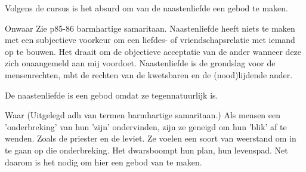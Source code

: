 \documentclass[main.tex]{subfiles}
\begin{document}
\begin{examenvraag}
    \begin{stelling}
        Volgens de cursus is het absurd om van de naastenliefde een gebod te maken.
    \end{stelling}

    \begin{stelling-antwoord}{Onwaar}
        Zie p85-86 barmhartige samaritaan.
        Naastenliefde heeft niets te maken met een subjectieve voorkeur om‭ ‬een liefdes-‭ ‬of 
        vriendschapsrelatie met iemand op te bouwen.‭ ‬Het draait om de objectieve acceptatie van de 
        ander wanneer deze zich onaangemeld aan mij voordoet.‭ ‬Naastenliefde is de grondslag voor de 
        mensenrechten,‭ ‬mbt de rechten van de kwetsbaren en de‭ (‬nood)lijdende ander.
    \end{stelling-antwoord}
\end{examenvraag}


\begin{examenvraag}
    \begin{stelling}
        De naastenliefde is een gebod omdat ze tegennatuurlijk is.
    \end{stelling}


    \begin{stelling-antwoord}{Waar}
        (Uitgelegd adh van termen barmhartige samaritaan.)
        Als mensen een 'onderbreking' van hun 'zijn' ondervinden, zijn ze geneigd om hun 'blik'
        af te wenden. 
        Zoals de priester en de leviet.
        Ze voelen een soort van weerstand om in te gaan op die onderbreking.
        Het dwarsboompt hun plan, hun levenspad.
        Net daarom is het nodig om hier een gebod van te maken.
    \end{stelling-antwoord}
\end{examenvraag}
\end{document}
